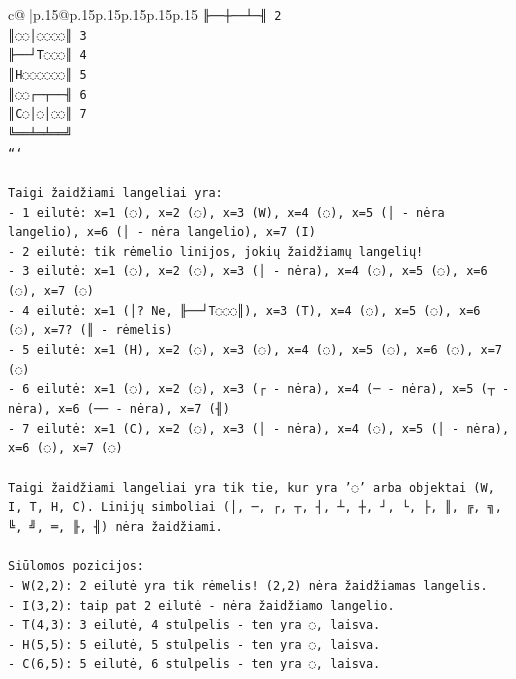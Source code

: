 \documentclass{article}
\begin{document}
{\begin{supertabular}{c@{$\;$}|p{.15\linewidth}@{}p{.15\linewidth}p{.15\linewidth}p{.15\linewidth}p{.15\linewidth}p{.15\linewidth}}
{{{\texttt{╟──┼──┴─╢ 2} \\
\texttt{║◌◌│◌◌◌◌║ 3} \\
\texttt{╟──┘T◌◌◌║ 4} \\
\texttt{║H◌◌◌◌◌◌║ 5} \\
\texttt{║◌◌┌─┬──╢ 6} \\
\texttt{║C◌│◌│◌◌║ 7} \\
\texttt{╚══╧═╧══╝} \\
\texttt{```} \\
\\ 
\texttt{Taigi žaidžiami langeliai yra:} \\
\texttt{{-} 1 eilutė: x=1 (◌), x=2 (◌), x=3 (W), x=4 (◌), x=5 (│ {-} nėra langelio), x=6 (│ {-} nėra langelio), x=7 (I)} \\
\texttt{{-} 2 eilutė: tik rėmelio linijos, jokių žaidžiamų langelių!} \\
\texttt{{-} 3 eilutė: x=1 (◌), x=2 (◌), x=3 (│ {-} nėra), x=4 (◌), x=5 (◌), x=6 (◌), x=7 (◌)} \\
\texttt{{-} 4 eilutė: x=1 (│? Ne, ╟──┘T◌◌◌║), x=3 (T), x=4 (◌), x=5 (◌), x=6 (◌), x=7? (║ {-} rėmelis)} \\
\texttt{{-} 5 eilutė: x=1 (H), x=2 (◌), x=3 (◌), x=4 (◌), x=5 (◌), x=6 (◌), x=7 (◌)} \\
\texttt{{-} 6 eilutė: x=1 (◌), x=2 (◌), x=3 (┌ {-} nėra), x=4 (─ {-} nėra), x=5 (┬ {-} nėra), x=6 (── {-} nėra), x=7 (╢)} \\
\texttt{{-} 7 eilutė: x=1 (C), x=2 (◌), x=3 (│ {-} nėra), x=4 (◌), x=5 (│ {-} nėra), x=6 (◌), x=7 (◌)} \\
\\ 
\texttt{Taigi žaidžiami langeliai yra tik tie, kur yra '◌' arba objektai (W, I, T, H, C). Linijų simboliai (│, ─, ┌, ┬, ┤, ┴, ┼, ┘, └, ├, ║, ╔, ╗, ╚, ╝, ═, ╟, ╢) nėra žaidžiami.} \\
\\ 
\texttt{Siūlomos pozicijos:} \\
\texttt{{-} W(2,2): 2 eilutė yra tik rėmelis! (2,2) nėra žaidžiamas langelis.} \\
\texttt{{-} I(3,2): taip pat 2 eilutė {-} nėra žaidžiamo langelio.} \\
\texttt{{-} T(4,3): 3 eilutė, 4 stulpelis {-} ten yra ◌, laisva.} \\
\texttt{{-} H(5,5): 5 eilutė, 5 stulpelis {-} ten yra ◌, laisva.} \\
\texttt{{-} C(6,5): 5 eilutė, 6 stulpelis {-} ten yra ◌, laisva.} \\
\\ 
}}}
\end{supertabular}}
\end{document}
